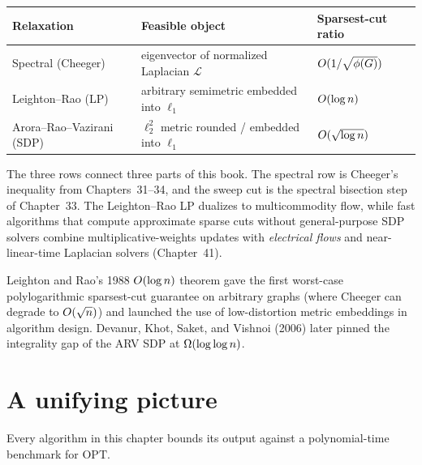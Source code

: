 \begin{center}
\begin{tabular}{lll}
\toprule
Relaxation & Feasible object & Sparsest-cut ratio \\
\midrule
Spectral (Cheeger) & eigenvector of normalized Laplacian $\mathcal{L}$ & $O(1/\sqrt{\phi(G)})$ \\
Leighton--Rao (LP) & arbitrary semimetric embedded into $\ell_1$ & $O(\log n)$ \\
Arora--Rao--Vazirani (SDP) & $\ell_2^2$ metric rounded / embedded into $\ell_1$ & $O(\sqrt{\log n})$ \\
\bottomrule
\end{tabular}
\end{center}

\begin{connectionbox}
The three rows connect three parts of this book. The spectral row is Cheeger's inequality from Chapters~31--34,
and the sweep cut is the spectral bisection step of Chapter~33. The Leighton--Rao LP dualizes to multicommodity
flow, while fast algorithms that compute approximate sparse cuts without general-purpose SDP solvers combine
multiplicative-weights updates with \emph{electrical flows} and near-linear-time Laplacian solvers (Chapter~41).
\end{connectionbox}

\begin{marginnotebox}
Leighton and Rao's 1988 $O(\log n)$ theorem gave the first worst-case polylogarithmic sparsest-cut
guarantee on arbitrary graphs (where Cheeger can degrade to $O(\sqrt{n})$) and launched the use of
low-distortion metric embeddings in algorithm design. Devanur, Khot, Saket, and Vishnoi (2006) later
pinned the integrality gap of the ARV SDP at $\Omega(\log\log n)$.
\end{marginnotebox}

\section{A unifying picture}

Every algorithm in this chapter bounds its output against a polynomial-time benchmark for $\mathrm{OPT}$.

